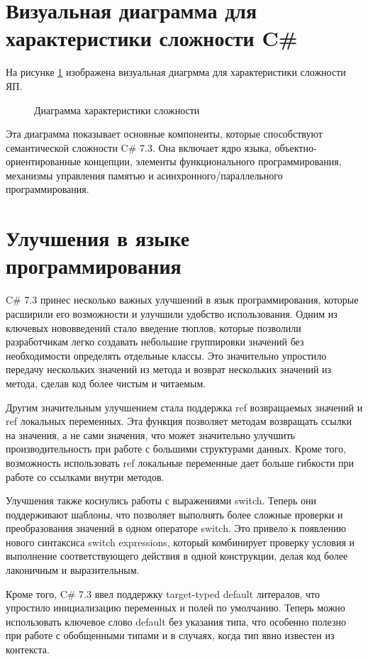 \documentclass[a4paper, 12pt]{article}
\begin{document}
\section{Визуальная диаграмма для характеристики сложности C\#}
На рисунке \ref{fig:sem} изображена визуальная диагрмма для характеристики сложности ЯП.

\begin{figure}

\caption{Диаграмма характеристики сложности}
\label{fig:sem}
\end{figure}
Эта диаграмма показывает основные компоненты, которые способствуют семантической сложности C\# 7.3. Она включает ядро языка, объектно-ориентированные концепции, элементы функционального программирования, механизмы управления памятью и асинхронного/параллельного программирования.
\section{Улучшения в языке программирования}

C\# 7.3 принес несколько важных улучшений в язык программирования, которые расширили его возможности и улучшили удобство использования. Одним из ключевых нововведений стало введение тюплов, которые позволили разработчикам легко создавать небольшие группировки значений без необходимости определять отдельные классы. Это значительно упростило передачу нескольких значений из метода и возврат нескольких значений из метода, сделав код более чистым и читаемым.

Другим значительным улучшением стала поддержка ref возвращаемых значений и ref локальных переменных. Эта функция позволяет методам возвращать ссылки на значения, а не сами значения, что может значительно улучшить производительность при работе с большими структурами данных. Кроме того, возможность использовать ref локальные переменные дает больше гибкости при работе со ссылками внутри методов.

Улучшения также коснулись работы с выражениями switch. Теперь они поддерживают шаблоны, что позволяет выполнять более сложные проверки и преобразования значений в одном операторе switch. Это привело к появлению нового синтаксиса switch expressions, который комбинирует проверку условия и выполнение соответствующего действия в одной конструкции, делая код более лаконичным и выразительным.

Кроме того, C\# 7.3 ввел поддержку target-typed default литералов, что упростило инициализацию переменных и полей по умолчанию. Теперь можно использовать ключевое слово default без указания типа, что особенно полезно при работе с обобщенными типами и в случаях, когда тип явно известен из контекста.
\end{document}
